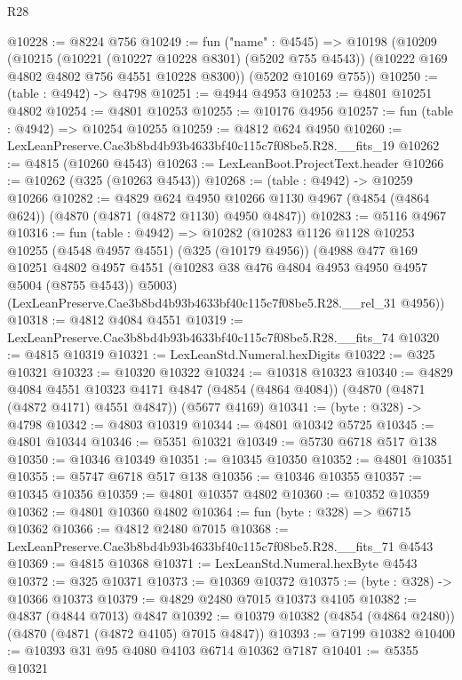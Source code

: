 \begin{lexlean}{R28}
\begin{coremodule}
@10228 := @8224 @756
@10249 := fun ("name" : @4545) =>
  @10198
    (@10209
      (@10215
        (@10221 (@10227 @10228 @8301) (@5202 @755 @4543))
        (@10222 @169 @4802 @4802 @756 @4551 @10228 @8300))
      (@5202 @10169 @755))
@10250 := (table : @4942) -> @4798
@10251 := @4944 @4953
@10253 := @4801 @10251 @4802
@10254 := @4801 @10253
@10255 := @10176 @4956
@10257 := fun (table : @4942) => @10254 @10255
@10259 := @4812 @624 @4950
@10260 := LexLeanPreserve.Cae3b8bd4b93b4633bf40c115c7f08be5.R28.__fits_19
@10262 := @4815 (@10260 @4543)
@10263 := LexLeanBoot.ProjectText.header
@10266 := @10262 (@325 (@10263 @4543))
@10268 := (table : @4942) -> @10259 @10266
@10282 := @4829
    @624
    @4950
    @10266
    @1130
    @4967
    (@4854 (@4864 @624))
    (@4870 (@4871 (@4872 @1130) @4950 @4847))
@10283 := @5116 @4967
@10316 := fun (table : @4942) =>
  @10282
    (@10283
      @1126
      @1128
      @10253
      @10255
      (@4548 @4957 @4551)
      (@325 (@10179 @4956))
      (@4988
        @477
        @169
        @10251
        @4802
        @4957
        @4551
        (@10283 @38 @476 @4804 @4953 @4950 @4957 @5004 (@8755 @4543))
        @5003)
      (LexLeanPreserve.Cae3b8bd4b93b4633bf40c115c7f08be5.R28.__rel_31 @4956))
@10318 := @4812 @4084 @4551
@10319 := LexLeanPreserve.Cae3b8bd4b93b4633bf40c115c7f08be5.R28.__fits_74
@10320 := @4815 @10319
@10321 := LexLeanStd.Numeral.hexDigits
@10322 := @325 @10321
@10323 := @10320 @10322
@10324 := @10318 @10323
@10340 := @4829
    @4084
    @4551
    @10323
    @4171
    @4847
    (@4854 (@4864 @4084))
    (@4870 (@4871 (@4872 @4171) @4551 @4847))
    (@5677 @4169)
@10341 := (byte : @328) -> @4798
@10342 := @4803 @10319
@10344 := @4801 @10342 @5725
@10345 := @4801 @10344
@10346 := @5351 @10321
@10349 := @5730 @6718 @517 @138
@10350 := @10346 @10349
@10351 := @10345 @10350
@10352 := @4801 @10351
@10355 := @5747 @6718 @517 @138
@10356 := @10346 @10355
@10357 := @10345 @10356
@10359 := @4801 @10357 @4802
@10360 := @10352 @10359
@10362 := @4801 @10360 @4802
@10364 := fun (byte : @328) => @6715 @10362
@10366 := @4812 @2480 @7015
@10368 := LexLeanPreserve.Cae3b8bd4b93b4633bf40c115c7f08be5.R28.__fits_71 @4543
@10369 := @4815 @10368
@10371 := LexLeanStd.Numeral.hexByte @4543
@10372 := @325 @10371
@10373 := @10369 @10372
@10375 := (byte : @328) -> @10366 @10373
@10379 := @4829 @2480 @7015 @10373 @4105
@10382 := @4837 (@4844 @7013) @4847
@10392 := @10379 @10382 (@4854 (@4864 @2480)) (@4870 (@4871 (@4872 @4105) @7015 @4847))
@10393 := @7199 @10382
@10400 := @10393 @31 @95 @4080 @4103 @6714 @10362 @7187
@10401 := @5355 @10321

\end{coremodule}
\end{lexlean}
